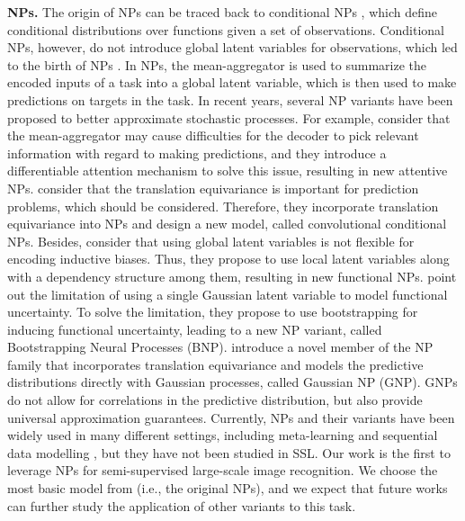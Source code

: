 \documentclass[nohyperref]{article}
\theoremstyle{plain}
\theoremstyle{definition}
\theoremstyle{remark}
\begin{document}
{\bf NPs.} The origin of NPs can be traced back to conditional NPs  \cite{garnelo2018conditional}, which define conditional distributions over functions given a set of observations. Conditional NPs, however, do not introduce global latent variables for observations, which led to the birth of NPs \cite{garnelo2018neural}. 
In NPs, the mean-aggregator is used to summarize the encoded inputs of a task into a global latent variable, which is then used to make predictions on targets in the task. In recent years, several NP variants have been proposed to better approximate stochastic processes. 
For example, \citet{kim2019attentive} consider that the mean-aggregator may cause difficulties for the decoder to pick relevant information with regard to making predictions, and they introduce a differentiable attention mechanism to solve this issue, resulting in new attentive NPs. 
\citet{gordon2019convolutional} consider that the translation equivariance is important for prediction problems, which should be considered. Therefore, they incorporate translation equivariance into NPs and design a new model,  called convolutional conditional NPs. 
Besides, \citet{louizos2019functional} consider that using global latent variables is not flexible for encoding inductive biases. Thus, they propose to use local latent variables along with a dependency structure among them, resulting in new functional NPs. 
\citet{lee2020bootstrapping} point out the limitation of using a single Gaussian latent variable to model functional uncertainty. To solve the limitation, they propose to use bootstrapping for inducing functional uncertainty, leading to a new NP variant, called Bootstrapping Neural Processes (BNP). 
\citet{bruinsma2021gaussian} introduce a novel member of the NP family that incorporates translation
equivariance and models the predictive distributions directly with Gaussian processes, called Gaussian NP (GNP). GNPs do not allow for correlations in the predictive distribution, but also provide universal approximation guarantees. 
Currently, NPs and their variants have been widely used in many different settings, including meta-learning \cite{singh2019sequential, yoon2020robustifying, requeima2019fast} and sequential data modelling \cite{qin2019recurrent}, but they have not been studied in SSL. Our work is the first to leverage NPs for semi-supervised large-scale image recognition. We choose the most basic model from \citep{garnelo2018neural} (i.e., the original NPs), and we expect that future works can further study the application of other variants to this task. 
\end{document}
